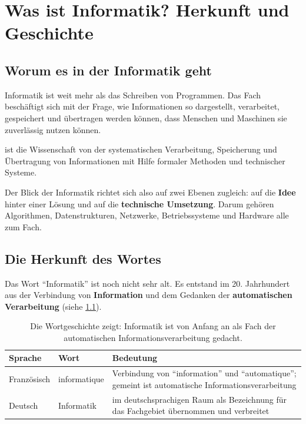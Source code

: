 \chapter{Was ist Informatik? Herkunft und Geschichte}\label{ch:geschichte_informatik}

\section{Worum es in der Informatik geht}

Informatik ist weit mehr als das Schreiben von Programmen. Das Fach beschäftigt sich mit der Frage, wie Informationen so dargestellt, verarbeitet, gespeichert und übertragen werden können, dass Menschen und Maschinen sie zuverlässig nutzen können.

\begin{mydefinition}[Informatik]
     ist die Wissenschaft von der systematischen Verarbeitung, Speicherung und Übertragung von Informationen mit Hilfe formaler Methoden und technischer Systeme.
\end{mydefinition}

Der Blick der Informatik richtet sich also auf zwei Ebenen zugleich: auf die \textbf{Idee} hinter einer Lösung und auf die \textbf{technische Umsetzung}. Darum gehören Algorithmen, Datenstrukturen, Netzwerke, Betriebssysteme und Hardware alle zum Fach.

\section{Die Herkunft des Wortes}

Das Wort \enquote{Informatik} ist noch nicht sehr alt. Es entstand im 20. Jahrhundert aus der Verbindung von \textbf{Information} und dem Gedanken der \textbf{automatischen Verarbeitung} (siehe \cref{tab:wortherkunft}).

\begin{table}[H]
    \centering
    \begin{tabular}{l|l|p{8.2cm}}
        \textbf{Sprache} & \textbf{Wort} & \textbf{Bedeutung} \\ \midrule\midrule
        Französisch & informatique & Verbindung von \enquote{information} und \enquote{automatique}; gemeint ist automatische Informationsverarbeitung \\ \midrule
        Deutsch & Informatik & im deutschsprachigen Raum als Bezeichnung für das Fachgebiet übernommen und verbreitet \\
    \end{tabular}
    \caption{Die Wortgeschichte zeigt: Informatik ist von Anfang an als Fach der automatischen Informationsverarbeitung gedacht.}
    \label{tab:wortherkunft}
\end{table}

